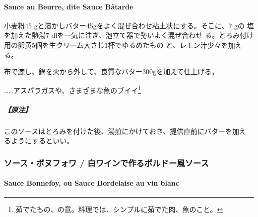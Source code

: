 \begin{recette}
\hypertarget{sauce-au-beurre}{%
\paragraph{Sauce au Beurre, dite Sauce Bâtarde}\label{sauce-au-beurre}}


小麦粉45 gと溶かしバター45gをよく混ぜ合わせ粘土状にする。そこに、7 gの
塩を加えた熱湯7\undemi{} dlを一気に注ぎ、泡立て器で勢いよく混ぜ合わせ
る。とろみ付け用の卵黄5個を生クリーム大さじ1\undemi{}杯でゆるめたもの
と、レモン汁少々を加える。

布で漉し、鍋を火から外して、良質なバター300gを加えて仕上げる。

\ldots{}\ldots{}アスパラガスや、さまざまな魚のブイイ\footnote{茹でたもの、の意。料理では、シンプルに茹でた肉、魚のこと。}

\hypertarget{ux539fux6ce8-1}{%
\subparagraph{【原注】}\label{ux539fux6ce8-1}}

このソースはとろみを付けた後、湯煎にかけておき、提供直前にバターを加え
るようにするといい。

\maeaki

\hypertarget{ux30bdux30fcux30b9ux30dcux30ccux30d5ux30a9ux30ef-ux767dux30efux30a4ux30f3ux3067ux4f5cux308bux30dcux30ebux30c9ux30fcux98a8ux30bdux30fcux30b9}{%
\subsubsection{ソース・ボヌフォワ /
白ワインで作るボルドー風ソース}\label{ux30bdux30fcux30b9ux30dcux30ccux30d5ux30a9ux30ef-ux767dux30efux30a4ux30f3ux3067ux4f5cux308bux30dcux30ebux30c9ux30fcux98a8ux30bdux30fcux30b9}}

\hypertarget{sauce-bonnefoy}{%
\paragraph{Sauce Bonnefoy, ou Sauce Bordelaise au vin
blanc}\label{sauce-bonnefoy}}



\end{recette}
